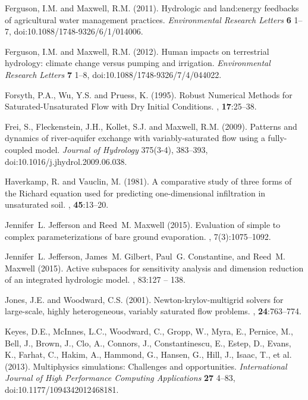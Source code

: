 \begin{thebibliography}{999}
Ferguson, I.M. and Maxwell, R.M. (2011). Hydrologic and land:energy feedbacks of agricultural water management practices. {\em Environmental Research Letters} {\bf 6} 1--7, doi:10.1088/1748-9326/6/1/014006.

Ferguson, I.M. and Maxwell, R.M. (2012). Human impacts on terrestrial hydrology: climate change versus pumping and irrigation. {\em Environmental Research Letters} {\bf 7} 1--8, doi:10.1088/1748-9326/7/4/044022.

Forsyth, P.A., Wu, Y.S. and Pruess, K. (1995).
\newblock Robust Numerical Methods for Saturated-Unsaturated Flow with Dry Initial Conditions.
, {\bf 17}:25--38.

Frei, S., Fleckenstein, J.H., Kollet, S.J. and Maxwell, R.M. (2009). Patterns and dynamics of river-aquifer exchange with variably-saturated flow using a fully-coupled model. {\em Journal of Hydrology} 375(3-4), 383--393, doi:10.1016/j.jhydrol.2009.06.038.

Haverkamp, R. and Vauclin, M. (1981).
\newblock A comparative study of three forms of the {R}ichard equation used for
  predicting one-dimensional infiltration in unsaturated soil.
, {\bf 45}:13--20.

	Jennifer~L. Jefferson and Reed~M. Maxwell (2015).
\newblock Evaluation of simple to complex parameterizations of bare ground
  evaporation.
, 7(3):1075--1092.

Jennifer~L. Jefferson, James~M. Gilbert, Paul~G. Constantine, and Reed~M.
Maxwell (2015).
\newblock Active subspaces for sensitivity analysis and dimension reduction of
  an integrated hydrologic model.
, 83:127 -- 138.


Jones, J.E. and Woodward, C.S. (2001).
\newblock Newton-krylov-multigrid solvers for large-scale, highly heterogeneous, variably saturated flow problems.
, {\bf 24}:763--774.

Keyes, D.E., McInnes, L.C., Woodward, C., Gropp, W., Myra, E., Pernice, M., Bell, J., Brown, J., Clo, A., Connors, J., Constantinescu, E., Estep, D., Evans, K., Farhat, C., Hakim, A., Hammond, G., Hansen, G., Hill, J., Isaac, T., et al. (2013). Multiphysics simulations: Challenges and opportunities. {\em International Journal of High Performance Computing Applications} {\bf 27} 4--83, doi:10.1177/1094342012468181.


\end{thebibliography}
